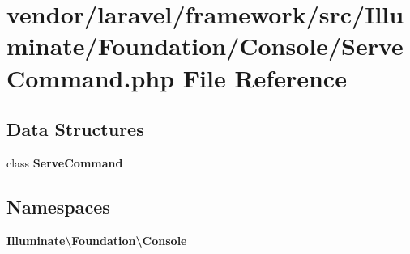\section{vendor/laravel/framework/src/\+Illuminate/\+Foundation/\+Console/\+Serve\+Command.php File Reference}
\label{_serve_command_8php}
\subsection*{Data Structures}
\begin{DoxyCompactItemize}
\item 
class {\bf Serve\+Command}
\end{DoxyCompactItemize}
\subsection*{Namespaces}
\begin{DoxyCompactItemize}
\item 
 {\bf Illuminate\textbackslash{}\+Foundation\textbackslash{}\+Console}
\end{DoxyCompactItemize}
